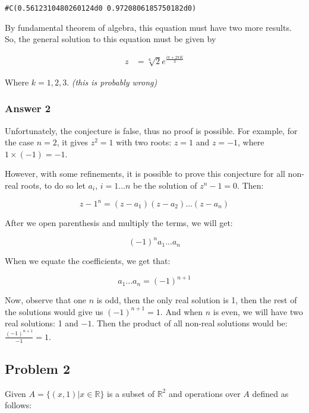 \documentclass[11pt]{article}
\begin{document}
\begin{verbatim}
#C(0.5612310480260124d0 0.9720806185750182d0)
\end{verbatim}

By fundamental theorem of algebra, this equation must have two more results.
So, the general solution to this equation must be given by

\begin{align*}
  z &= \sqrt[6]{2}e^{\frac{i\pi+2\pi K}{3}}
\end{align*}

Where $k=1,2,3$. \emph{(this is probably wrong)}
\subsubsection{Answer 2}
\label{sec-1-1-2}
Unfortunately, the conjecture is false, thus no proof is possible.  For example,
for the case $n=2$, it gives $z^2=1$ with two roots: $z=1$ and $z=-1$, where
$1 \times (-1) = -1$.

However, with some refinements, it is possible to prove this conjecture for
all non-real roots, to do so let $a_i$, $i=1...n$ be the solution of $z^n-1=0$.
Then:

\begin{equation*}
  z - 1^n = (z - a_1)(z - a_2)...(z - a_n)
\end{equation*}

After we open parenthesis and multiply the terms, we will get:

\begin{equation*}
  (-1)^n a_1...a_n
\end{equation*}

When we equate the coefficients, we get that:

\begin{equation*}
  a_1...a_n = (-1)^{n+1}
\end{equation*}

Now, observe that one $n$ is odd, then the only real solution is 1, then
the rest of the solutions would give us $(-1)^{n+1} = 1$.  And when $n$
is even, we will have two real solutions: 1 and $-1$. Then the product of
all non-real solutions would be: $\frac{(-1)^{n+1}}{-1} = 1$.
\subsection{Problem 2}
\label{sec-1-2}
Given $A = \{(x,1)|x \in \mathbb{R}\}$ is a subset of $\mathbb{R}^2$ and
operations over $A$ defined as follows:
\end{document}
